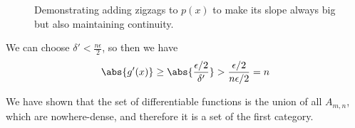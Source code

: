 {{\begin{figure}[H]
  \caption{
    Demonstrating adding zigzags to $p(x)$ to make its slope always big but
    also maintaining continuity.
  }
  \label{chap8:fig:zigzags_px}
\end{figure}

We can choose $\delta' < \frac{n\epsilon}{2}$,
so then we have 
\begin{equation}
  \abs{g'(x)} \geq \abs{
    \frac{
      \epsilon/2
    }{
      \delta'
    }
  } > \frac{
    \epsilon/2
  }{
    n\epsilon/2
  } = n
\end{equation}
}
We have shown that the set of differentiable functions is 
the union of all $A_{m, n}$, which are nowhere-dense, and therefore 
it is a set of the first category.
}